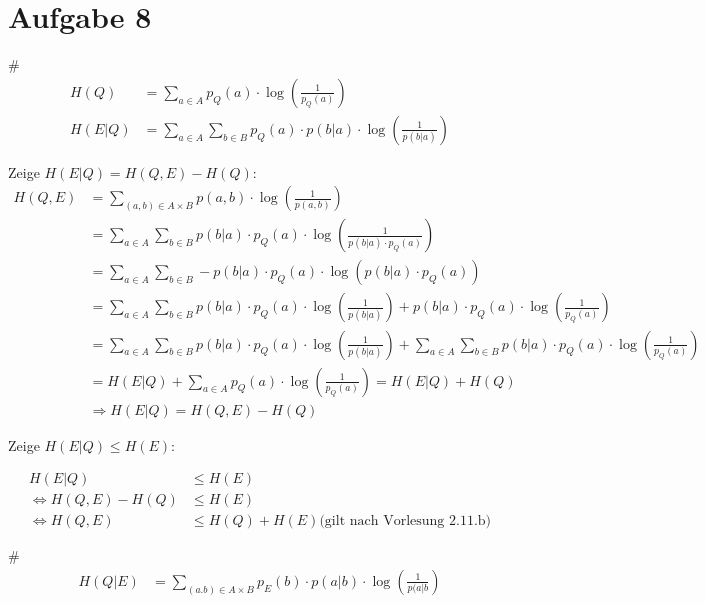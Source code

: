 \section*{Aufgabe 8}
\begin{myList}
#
\begin{align*}
	H(Q) &= \sum\limits_{a \in A} p_Q(a) \cdot \log \left( \frac{1}{p_Q(a)} \right) \\
	H(E|Q) &= \sum\limits_{a \in A} \sum\limits_{b \in B} p_Q(a) \cdot p(b|a) \cdot \log \left( \frac{1}{p(b|a)}\right) 
\end{align*}

Zeige $H(E|Q) = H(Q,E) - H(Q)$:
\begin{align*}
	H(Q,E) &= \sum\limits_{(a,b) \in A\times B} p(a,b) \cdot \log\left(\frac{1}{p(a,b)}\right) \\
	&= \sum\limits_{a \in A} \sum\limits_{b \in B} p(b|a) \cdot p_Q(a) \cdot \log \left( \frac{1}{p(b|a) \cdot p_Q(a)} \right) \\
	&= \sum\limits_{a \in A} \sum\limits_{b \in B} -p(b|a) \cdot p_Q(a) \cdot \log \left(p(b|a) \cdot p_Q(a) \right) \\
	&= \sum\limits_{a \in A} \sum\limits_{b \in B} p(b|a) \cdot p_Q(a) \cdot \log \left(\frac{1}{p(b|a)} \right) + p(b|a) \cdot p_Q(a) \cdot \log \left(\frac{1}{p_Q(a)} \right) \\
	&= \sum\limits_{a \in A} \sum\limits_{b \in B} p(b|a) \cdot p_Q(a) \cdot \log \left(\frac{1}{p(b|a)} \right) + \sum\limits_{a \in A} \sum\limits_{b \in B} p(b|a) \cdot p_Q(a) \cdot \log \left(\frac{1}{p_Q(a)} \right) \\
	&= H(E|Q) + \sum\limits_{a \in A}  p_Q(a) \cdot \log \left(\frac{1}{p_Q(a)} \right) = H(E|Q) + H(Q)\\
	&\Rightarrow H(E|Q) = H(Q,E) - H(Q)
\end{align*}

Zeige $H(E|Q) \leq H(E)$:

\begin{align*}
	 H(E|Q) &\leq H(E) \\
	\Leftrightarrow H(Q,E) - H(Q) &\leq H(E) \\
	\Leftrightarrow H(Q,E) &\leq H(Q) + H(E) \text{(gilt nach Vorlesung 2.11.b)}
\end{align*}

#
\begin{align*}
	H(Q|E) &= \sum\limits_{(a.b) \in A \times B} p_E(b)\cdot p(a|b) \cdot \log \left( \frac{1}{p(a|b}\right)
\end{align*}


\end{myList}
